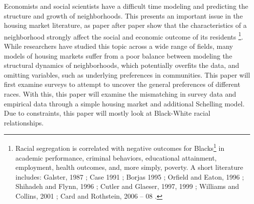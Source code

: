 \documentclass[11pt]{asaproc}
\newcommand{\1}{\mathbb{1}}
\begin{document}
Economists and social scientists have a difficult time modeling and predicting the structure and growth of neighborhoods. This presents an important issue in the housing market literature, as paper after paper show that the characteristics of a neighborhood strongly affect the social and economic outcome of its residents \footnote{Racial segregation is correlated with negative outcomes for Blacks\footnote{I use the term "Black" to refer to African-Americans in this paper because most of the surveys in this paper use the term "Black" in their terminology.} in academic performance, criminal behaviors, educational attainment, employment, health outcomes, and, more simply, poverty. A short literature includes: Galster, 1987 \citep{galster87}; Case 1991 \citep{case91}; Borjas 1995 \citep{borjas95}; Orfield and Eaton, 1996 \citep{orfield97}; Shihadeh and Flynn, 1996 \citep{shihadeh96}; Cutler and Glaeser, 1997, 1999 \citep{cutler97,cutler99}; Williams and Collins, 2001 \citep{william01}; Card and Rothstein, 2006 -- 08 \citep{card06,card07,card08}.}. While researchers have studied this topic across a wide range of fields, many models of housing markets suffer from a poor balance between modeling the structural dynamics of neighborhoods, which potentially overfits the data, and omitting variables, such as underlying preferences in communities. This paper will first examine surveys to attempt to uncover the general preferences of different races. With this, this paper will examine the mismatching in survey data and empirical data through a simple housing market and additional Schelling model. Due to constraints, this paper will mostly look at Black-White racial relationships.
%
%
%
\end{document}
